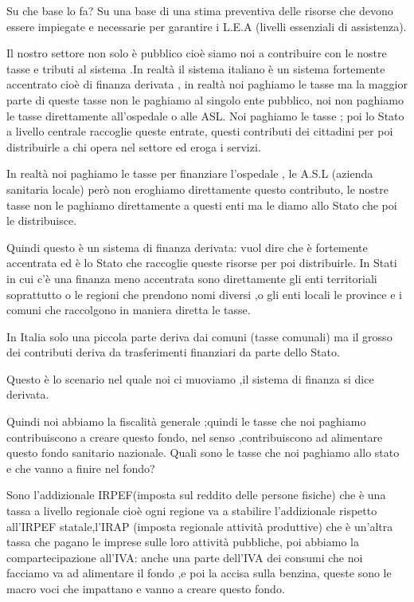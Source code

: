 \documentclass[]{article}
\begin{document}
Su che base lo fa? Su una base di una stima preventiva delle risorse che
devono essere impiegate e necessarie per garantire i L.E.A (livelli
essenziali di assistenza).

Il nostro settore non solo è pubblico cioè siamo noi a contribuire con
le nostre tasse e tributi al sistema .In realtà il sistema italiano è un
sistema fortemente accentrato cioè di finanza derivata , in realtà noi
paghiamo le tasse ma la maggior parte di queste tasse non le paghiamo al
singolo ente pubblico, noi non paghiamo le tasse direttamente
all'ospedale o alle ASL. Noi paghiamo le tasse ; poi lo Stato a livello
centrale raccoglie queste entrate, questi contributi dei cittadini per
poi distribuirle a chi opera nel settore ed eroga i servizi.

In realtà noi paghiamo le tasse per finanziare l'ospedale , le A.S.L
(azienda sanitaria locale) però non eroghiamo direttamente questo
contributo, le nostre tasse non le paghiamo direttamente a questi enti
ma le diamo allo Stato che poi le distribuisce.

Quindi questo è un sistema di finanza derivata: vuol dire che è
fortemente accentrata ed è lo Stato che raccoglie queste risorse per poi
distribuirle. In Stati in cui c'è una finanza meno accentrata sono
direttamente gli enti territoriali soprattutto o le regioni che prendono
nomi diversi ,o gli enti locali le province e i comuni che raccolgono in
maniera diretta le tasse.

In Italia solo una piccola parte deriva dai comuni (tasse comunali) ma
il grosso dei contributi deriva da trasferimenti finanziari da parte
dello Stato.

Questo è lo scenario nel quale noi ci muoviamo ,il sistema di finanza si
dice derivata.

Quindi noi abbiamo la fiscalità generale ;quindi le tasse che noi
paghiamo contribuiscono a creare questo fondo, nel senso ,contribuiscono
ad alimentare questo fondo sanitario nazionale. Quali sono le tasse che
noi paghiamo allo stato e che vanno a finire nel fondo?

Sono l'addizionale IRPEF(imposta sul reddito delle persone fisiche) che
è una tassa a livello regionale cioè ogni regione va a stabilire
l'addizionale rispetto all'IRPEF statale,l'IRAP (imposta regionale
attività produttive) che è un'altra tassa che pagano le imprese sulle
loro attività pubbliche, poi abbiamo la compartecipazione all'IVA: anche
una parte dell'IVA dei consumi che noi facciamo va ad alimentare il
fondo ,e poi la accisa sulla benzina, queste sono le macro voci che
impattano e vanno a creare questo fondo.
\end{document}
